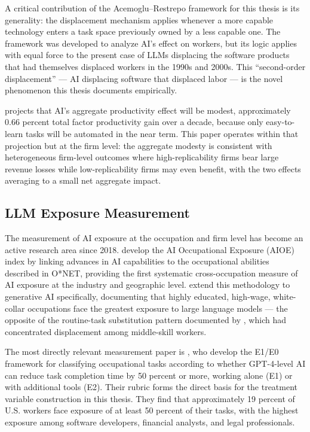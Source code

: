 \documentclass[12pt,a4paper]{article}
\begin{document}
A critical contribution of the Acemoglu--Restrepo framework for this thesis is its generality: the displacement mechanism applies whenever a more capable technology enters a task space previously owned by a less capable one. The framework was developed to analyze AI's effect on workers, but its logic applies with equal force to the present case of LLMs displacing the software products that had themselves displaced workers in the 1990s and 2000s. This ``second-order displacement'' --- AI displacing software that displaced labor --- is the novel phenomenon this thesis documents empirically.

\citet{acemoglu2024simple} projects that AI's aggregate productivity effect will be modest, approximately 0.66 percent total factor productivity gain over a decade, because only easy-to-learn tasks will be automated in the near term. This paper operates within that projection but at the firm level: the aggregate modesty is consistent with heterogeneous firm-level outcomes where high-replicability firms bear large revenue losses while low-replicability firms may even benefit, with the two effects averaging to a small net aggregate impact.

\subsection{LLM Exposure Measurement}

The measurement of AI exposure at the occupation and firm level has become an active research area since 2018. \citet{felten2021} develop the AI Occupational Exposure (AIOE) index by linking advances in AI capabilities to the occupational abilities described in O*NET, providing the first systematic cross-occupation measure of AI exposure at the industry and geographic level. \citet{felten2023} extend this methodology to generative AI specifically, documenting that highly educated, high-wage, white-collar occupations face the greatest exposure to large language models --- the opposite of the routine-task substitution pattern documented by \citet{autor2003}, which had concentrated displacement among middle-skill workers.

The most directly relevant measurement paper is \citet{eloundou2024}, who develop the E1/E0 framework for classifying occupational tasks according to whether GPT-4-level AI can reduce task completion time by 50 percent or more, working alone (E1) or with additional tools (E2). Their rubric forms the direct basis for the treatment variable construction in this thesis. They find that approximately 19 percent of U.S. workers face exposure of at least 50 percent of their tasks, with the highest exposure among software developers, financial analysts, and legal professionals.
\end{document}
